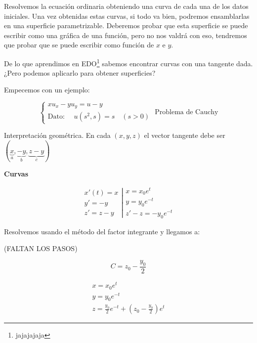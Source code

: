 	Resolvemos la ecuación ordinaria obteniendo una curva de cada una de los datos iniciales. Una vez obtenidas estas curvas, si todo va bien, podremos ensamblarlas en una superficie parametrizable. Deberemos probar que esta superficie se puede escribir como una gráfica de una función, pero no nos valdrá con eso, tendremos que probar que se puede escribir como función de $x$ e $y$.

	De lo que aprendimos en EDO\footnote{jajajajaja} sabemos encontrar curvas con una tangente dada. ¿Pero podemos aplicarlo para obtener superficies?

	Empecemos con un ejemplo:

	\begin{example}{1}

		\begin{equation*}
			\left\{
			\begin{array}{l}
				xu_x - yu_y = u - y \\
				\text{Dato: }\quad u(s^2,s) = s \quad (s > 0)
			\end{array}
			\right. \text{  Problema de Cauchy}
		\end{equation*}

		Interpretación geométrica. En cada $(x,y,z)$ el vector tangente debe ser $(\underbrace{x}_{a},\underbrace{-y}_{b},\underbrace{z-y}_{c})$

		\textbf{Curvas}

		\begin{equation*}
			\left.
			\begin{array}{rl}
				 x'(t) = x \\
				 y' = -y \\
				 z' = z-y
			\end{array}
			\right|
			\begin{array}{l}
				x = x_0 e^t \\
				y = y_0 e^{-t} \\
				z' -z = -y_0 e^{-t}
			\end{array}
		\end{equation*}


		Resolvemos usando el método del factor integrante y llegamos a:

		(FALTAN LOS PASOS)

		$$C = z_0 - \frac{y_0}{2}$$

		\begin{equation*}
			\begin{array}{l}
				x = x_0 e^t \\
				y = y_0 e^{-t} \\
				z = \frac{y_0}{2} e^{-t} + (z_0 - \frac{y_0}{2})e^t
			\end{array}
		\end{equation*}


\end{example}
